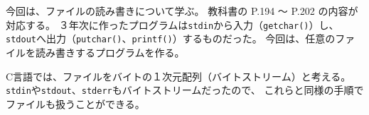 \documentclass[a4j,dvipdfmx]{jarticle}
\begin{document}
\def\lstlistingname{リスト}


今回は、ファイルの読み書きについて学ぶ。
教科書の P.194 〜 P.202 の内容が対応する。
３年次に作ったプログラムは{\tt stdin}から入力（{\tt getchar()}）し、
{\tt stdout}へ出力（{\tt putchar()}、{\tt printf()}）するものだった。
今回は、任意のファイルを読み書きするプログラムを作る。

C言語では、ファイルをバイトの１次元配列（バイトストリーム）と考える。
{\tt stdin}や{\tt stdout}、{\tt stderr}もバイトストリームだったので、
これらと同様の手順でファイルも扱うことができる。
\end{document}
